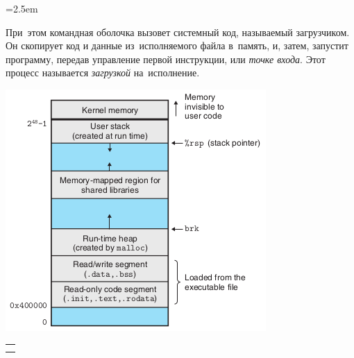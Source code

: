 \noindent
\begin{minipage}[t]{0.5\textwidth}
\parindent=2.5em

При~этом командная оболочка вызовет системный код, называемый загрузчиком. Он скопирует код и данные из~исполняемого файла в~память, и, затем, запустит программу, передав управление первой инструкции, или \emph{точке входа}. Этот процесс называется \emph{загрузкой} на~исполнение.

\end{minipage}\hfill\begin{minipage}[t]{0.5\textwidth}

\vspace{-5em}
\includegraphics[width=\textwidth]{images/loaded_executable.png}

\end{minipage}



\WhatToReadSection
\begin{tabular}{@{}l@{}}
  \citeauthor[глава~7, стр.~634--660]{Bryant:2022:ru} \\
  \citeauthor[глава~7, стр.~571--592]{Tanenbaum:2007:ru}
\end{tabular}
